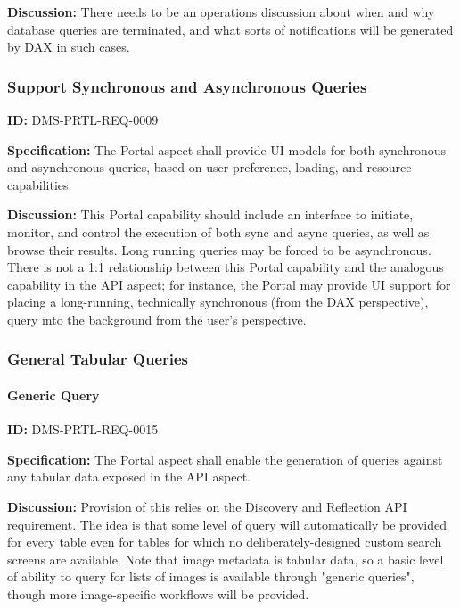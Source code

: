 \documentclass[SE,toc,lsstdraft]{lsstdoc}
\begin{document}
\textbf{Discussion:}
There needs to be an operations discussion about when and why database queries are terminated, and what sorts of notifications will be generated by DAX in such cases.

\subsubsection{Support Synchronous and Asynchronous Queries}

\label{DMS-PRTL-REQ-0009}
\textbf{ID:} DMS-PRTL-REQ-0009

\textbf{Specification:}
The Portal aspect shall provide UI models for both synchronous and asynchronous queries, based on user preference, loading, and resource capabilities.

\textbf{Discussion:}
This Portal capability should include an interface to initiate, monitor, and control the execution of both sync and async queries, as well as browse their results. Long running queries may be forced to be asynchronous.
There is not a 1:1 relationship between this Portal capability and the analogous capability in the API aspect; for instance, the Portal may provide UI support for placing a long-running, technically synchronous (from the DAX perspective), query into the background from the user's perspective.

\subsubsection{General Tabular Queries}

\paragraph{Generic Query}\hfill  %

\label{DMS-PRTL-REQ-0015}
\textbf{ID:} DMS-PRTL-REQ-0015

\textbf{Specification:}
The Portal aspect shall enable the generation of queries against any tabular data exposed in the API aspect.

\textbf{Discussion:}
Provision of this relies on the Discovery and Reflection API requirement.  The idea is that some level of query will automatically be provided for every table even for tables for which no deliberately-designed custom search screens are available.
Note that image metadata is tabular data, so a basic level of ability to query for lists of images is available through "generic queries", though more image-specific workflows will be provided.
\end{document}
